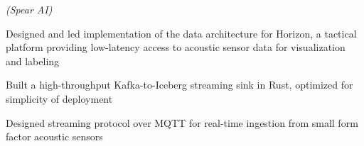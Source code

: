  \emph{(Spear AI)}
\begin{subenum}
\item Designed and led implementation of the data architecture for Horizon, a
  tactical platform providing low-latency access to acoustic sensor data for
  visualization and labeling
\item Built a high-throughput Kafka-to-Iceberg streaming sink in Rust, optimized
  for simplicity of deployment
\item Designed streaming protocol over MQTT for real-time ingestion from small
  form factor acoustic sensors
\end{subenum}
